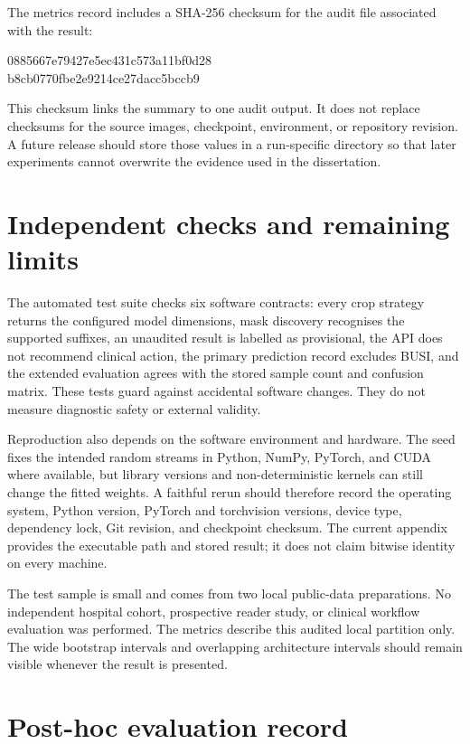 The metrics record includes a SHA-256 checksum for the audit file associated with the result:

\begin{center}
\small\ttfamily
0885667e79427e5ec431c573a11bf0d28\\
b8cb0770fbe2e9214ce27dacc5bccb9
\end{center}

This checksum links the summary to one audit output. It does not replace checksums for the source images, checkpoint, environment, or repository revision. A future release should store those values in a run-specific directory so that later experiments cannot overwrite the evidence used in the dissertation.

\section{Independent checks and remaining limits}

The automated test suite checks six software contracts: every crop strategy returns the configured model dimensions, mask discovery recognises the supported suffixes, an unaudited result is labelled as provisional, the API does not recommend clinical action, the primary prediction record excludes BUSI, and the extended evaluation agrees with the stored sample count and confusion matrix. These tests guard against accidental software changes. They do not measure diagnostic safety or external validity.

Reproduction also depends on the software environment and hardware. The seed fixes the intended random streams in Python, NumPy, PyTorch, and CUDA where available, but library versions and non-deterministic kernels can still change the fitted weights. A faithful rerun should therefore record the operating system, Python version, PyTorch and torchvision versions, device type, dependency lock, Git revision, and checkpoint checksum. The current appendix provides the executable path and stored result; it does not claim bitwise identity on every machine.

The test sample is small and comes from two local public-data preparations. No independent hospital cohort, prospective reader study, or clinical workflow evaluation was performed. The metrics describe this audited local partition only. The wide bootstrap intervals and overlapping architecture intervals should remain visible whenever the result is presented.

\section{Post-hoc evaluation record}

